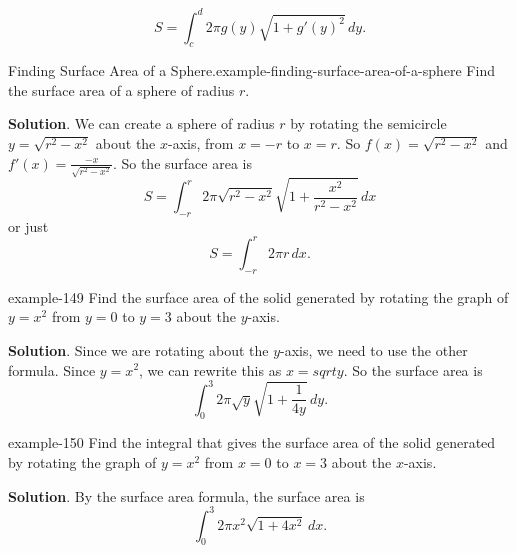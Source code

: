 \documentclass[10pt,]{book}
\numberwithin{equation}{section}
\begin{document}
\begin{equation*}
S=\int_{c}^{d}2\pi g(y)\sqrt{1+g'(y)^{2}}\,dy.
\end{equation*}
%
\begin{example}{Finding Surface Area of a Sphere.}{example-finding-surface-area-of-a-sphere}%
\hypertarget{p-665}{}%
Find the surface area of a sphere of radius \(r\).%
\par\smallskip%
\noindent\textbf{Solution}.\hypertarget{solution-144}{}\quad%
\hypertarget{p-666}{}%
We can create a sphere of radius \(r\) by rotating the semicircle \(y=\sqrt{r^{2}-x^{2}}\) about the \(x\)-axis, from \(x=-r\) to \(x=r\). So \(f(x)=\sqrt{r^{2}-x^{2}}\) and \(f'(x)=\displaystyle\frac{-x}{\sqrt{r^{2}-x^{2}}}\). So the surface area is%
\begin{equation*}
S=\int_{-r}^{r}2\pi\sqrt{r^{2}-x^{2}}\sqrt{1+\frac{x^{2}}{r^{2}-x^{2}}}\,dx
\end{equation*}
or just%
\begin{equation*}
S=\int_{-r}^{r}2\pi r \, dx.
\end{equation*}
%
\end{example}
\begin{example}{}{example-149}%
\hypertarget{p-667}{}%
Find the surface area of the solid generated by rotating the graph of \(y=x^{2}\) from \(y=0\) to \(y=3\) about the \(y\)-axis.%
\par\smallskip%
\noindent\textbf{Solution}.\hypertarget{solution-145}{}\quad%
\hypertarget{p-668}{}%
Since we are rotating about the \(y\)-axis, we need to use the other formula. Since \(y=x^{2}\), we can rewrite this as \(x=sqrt{y}\). So the surface area is%
\begin{equation*}
\int_{0}^{3}2\pi\sqrt{y}\sqrt{1+\frac{1}{4y}}\,dy.
\end{equation*}
%
\end{example}
\begin{example}{}{example-150}%
\hypertarget{p-669}{}%
Find the integral that gives the surface area of the solid generated by rotating the graph of \(y=x^{2}\) from \(x=0\) to \(x=3\) about the \(x\)-axis.%
\par\smallskip%
\noindent\textbf{Solution}.\hypertarget{solution-146}{}\quad%
\hypertarget{p-670}{}%
By the surface area formula, the surface area is%
\begin{equation*}
\int_{0}^{3}2 \pi x^{2} \sqrt{1+4x^{2}}\,dx.
\end{equation*}
%
\end{example}
\end{document}
